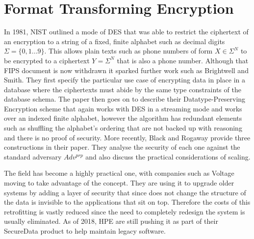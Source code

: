 \documentclass[12pt,a4paper]{article}
\begin{document}
\pagebreak
\section{Format Transforming Encryption}

In 1981, NIST\cite{FIPS74} outlined a mode of DES that was able to restrict the ciphertext of an encryption to a string of a fixed, finite alphabet such as decimal digits $ \Sigma = \{0,1...9\} $. This allows plain texts such as phone numbers of form $ X \in \Sigma^N $ to be encrypted to a ciphertext $ Y = \Sigma^N $ that is also a phone number. Although that FIPS document is now withdrawn it sparked further work such as Brightwell and Smith\cite{DPE}. They first specify the particular use case of encrypting data in place in a database where the ciphertexts must abide by the same type constraints of the database schema. The paper then goes on to describe their  Datatype-Preserving Encryption scheme that again works with DES in a streaming mode and works over an indexed finite alphabet, however the algorithm has redundant elements such as shuffling the alphabet's ordering that are not backed up with reasoning and there is no proof of security. More recently, Black and Rogaway\cite{CAFD} provide three constructions in their paper. They analyse the security of each one against the standard adversary $Adv^{prp}$ and also discuss the practical considerations of scaling.

The field has become a highly practical one, with companies such as Voltage moving to take advantage of the concept. They are using it to upgrade older systems by adding a layer of security that since does not change the structure of the data is invisible to the applications that sit on top. Therefore the costs of this retrofitting is vastly reduced since the need to completely redesign the system is usually eliminated. As of 2018, HPE\cite{hp} are still pushing it as part of their SecureData product to help maintain legacy software.
\end{document}
